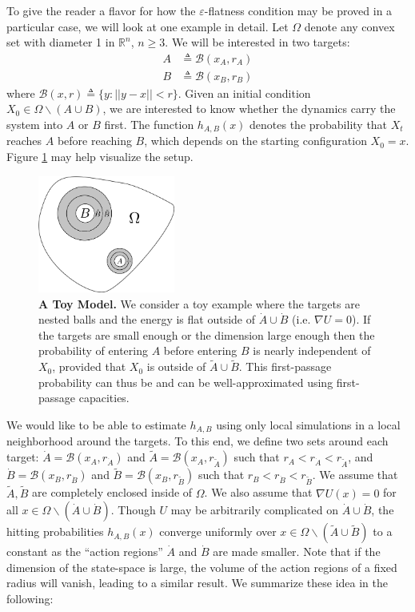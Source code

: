 \documentclass[12pt, nofootinbib,english, amsmath, amssymb, aps, priprint, graphicx,floatfix]{revtex4-1}
\theoremstyle{plain}
\theoremstyle{definition}
\theoremstyle{plain}
\newcommand{\bb}[1]{\mathcal{B}\left(#1\right)}
\newcommand{\dA}{{\dot A}}
\newcommand{\tA}{{\tilde A}}
\newcommand{\dB}{{\dot B}}
\newcommand{\tB}{{\tilde B}}
\begin{document}
To give the reader a flavor for how the $\varepsilon$-flatness condition may be proved in a particular case, we will look at one example in detail.  Let $\Omega$ denote any convex set with diameter 1 in $\mathbb{R}^n$, $n\geq 3$.  We will be interested in two targets:
\begin{align*}
A &\triangleq \bb {x_A, r_A}\\
B &\triangleq \bb {x_B, r_B}
\end{align*}
where $\bb{x, r} \triangleq \{ y : || y - x || < r \}$.  Given an initial condition $X_0\in \Omega \backslash (A\cup B)$, we are interested to know whether the dynamics carry the system into $A$ or $B$ first.  The function $h_{A,B}(x)$ denotes the probability that $X_t$ reaches $A$ before reaching $B$, which depends on the starting configuration $X_0=x$.  Figure \ref{fig:ToyModel2} may help visualize the setup.

\begin{figure}
    \centering  \includegraphics[width=0.4\textwidth]{ToyModel4.png}
    \caption{\footnotesize\linespread{1.}\selectfont{} {\bf A Toy Model.} We consider a toy example where the targets are nested balls and the energy is flat outside of $\dA\cup\dB$ (i.e. $\nabla U=0$). If the targets are small enough or the dimension large enough then the probability of entering $A$ before entering $B$ is nearly independent of $X_0$, provided that $X_0$ is outside of $\tA\cup\tB$. This first-passage probability can thus be and can be well-approximated using first-passage capacities.}
\label{fig:ToyModel2}
\end{figure}
We would like to be able to estimate $h_{A,B}$ using only local simulations in a local neighborhood around the targets.  To this end, we define two sets around each target: $\dA=\bb{x_A,r_\dA }$ and $\tA=\bb{x_A,r_\tA }$ such that $r_A<r_\dA<r_\tA$, and
$\dB=\bb{x_B,r_\dB }$ and $\tB=\bb{x_B,r_\tB }$ such that $r_B<r_\dB<r_\tB$.  We assume that $\tA,\tB$ are completely enclosed inside of $\Omega$.  We also assume that $\nabla U(x)=0$ for all $x\in\Omega\backslash (\dA\cup\dB)$.  
Though $U$ may be arbitrarily complicated on $\dA \cup \dB$, the hitting probabilities $h_{A,B}(x)$ converge uniformly over $x\in \Omega \backslash (\tA\cup \tB)$ to a constant as the ``action regions'' $\dA$ and $\dB$ are made smaller.  Note that if the dimension of the state-space is large, the volume of the action regions of a fixed radius will vanish, leading to a similar result.  We summarize these idea in the following:
\end{document}
